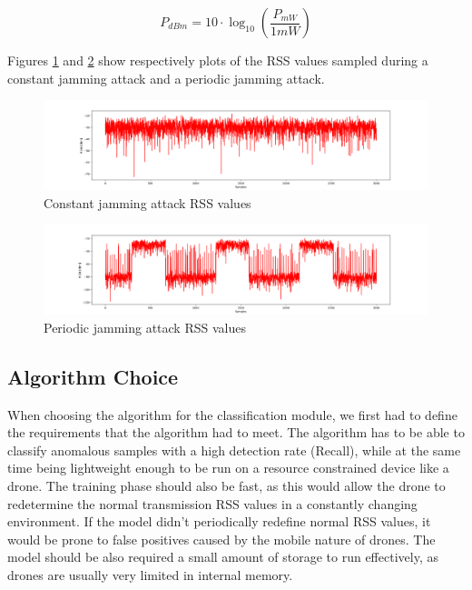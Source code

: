 \documentclass[futureinternet,article,submit,pdftex,moreauthors]{Definitions/mdpi}
\begin{document}
\begin{linenomath}
	\begin{equation}
		P_{dBm} = 10 \cdot \log_{10} \left( \frac{P_{mW}}{1mW} \right)
		\label{eq:dbm_to_mw}
	\end{equation}
\end{linenomath}

Figures \ref{fig:ConstantJammingSignal} and \ref{fig:PeriodicJammingSignal} show respectively plots of the RSS values sampled during a constant jamming attack and a periodic jamming attack. 

\begin{figure}[H]
	\includegraphics[width=10.5 cm]{img/ConstantJammingSignal.png}
	\caption{Constant jamming attack RSS values}
	\label{fig:ConstantJammingSignal}
\end{figure}   
\unskip
\begin{figure}[H]
	\includegraphics[width=10.5 cm]{img/PeriodicJammingSignal.png}
	\caption{Periodic jamming attack RSS values}
	\label{fig:PeriodicJammingSignal}
\end{figure}   
\unskip

\subsection {Algorithm Choice}

When choosing the algorithm for the classification module, we first had to define the requirements that the algorithm had to meet. The algorithm has to be able to classify anomalous samples with a high detection rate (Recall), while at the same time 
being lightweight enough to be run on a resource constrained device like a drone. The training phase should also be fast, as this would allow the drone to redetermine the normal transmission RSS values in a constantly changing environment. If the model didn't periodically redefine normal RSS values, 
it would be prone to false positives caused by the mobile nature of drones. 
The model should be also required a small amount of storage to run effectively, as drones are usually very limited in internal memory. 
\end{document}
